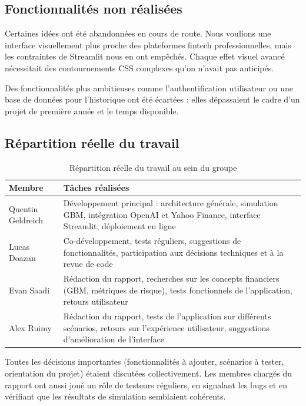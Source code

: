 \documentclass[a4paper, 12pt, twoside]{article}
\begin{document}
\subsection{Fonctionnalités non réalisées}

Certaines idées ont été abandonnées en cours de route. Nous voulions une interface
visuellement plus proche des plateformes fintech professionnelles, mais les contraintes
de Streamlit nous en ont empêchés. Chaque effet visuel avancé nécessitait des
contournements CSS complexes qu'on n'avait pas anticipés.

Des fonctionnalités plus ambitieuses comme l'authentification utilisateur ou une base
de données pour l'historique ont été écartées : elles dépassaient le cadre d'un projet
de première année et le temps disponible.

\subsection{Répartition réelle du travail}

\begin{table}[h]
\begin{center}
\begin{tabular}{|l|p{10cm}|}
\hline
\textbf{Membre} & \textbf{Tâches réalisées} \\
\hline
Quentin Geldreich & Développement principal : architecture générale, simulation GBM,
intégration OpenAI et Yahoo Finance, interface Streamlit, déploiement en ligne \\
\hline
Lucas Doazan & Co-développement, tests réguliers, suggestions de fonctionnalités,
participation aux décisions techniques et à la revue de code \\
\hline
Evan Saadi & Rédaction du rapport, recherches sur les concepts financiers (GBM,
métriques de risque), tests fonctionnels de l'application, retours utilisateur \\
\hline
Alex Ruimy & Rédaction du rapport, tests de l'application sur différents scénarios,
retours sur l'expérience utilisateur, suggestions d'amélioration de l'interface \\
\hline
\end{tabular}
\end{center}
\caption{Répartition réelle du travail au sein du groupe}
\end{table}

Toutes les décisions importantes (fonctionnalités à ajouter, scénarios à tester,
orientation du projet) étaient discutées collectivement. Les membres chargés du
rapport ont aussi joué un rôle de testeurs réguliers, en signalant les bugs et en
vérifiant que les résultats de simulation semblaient cohérents.
\end{document}

